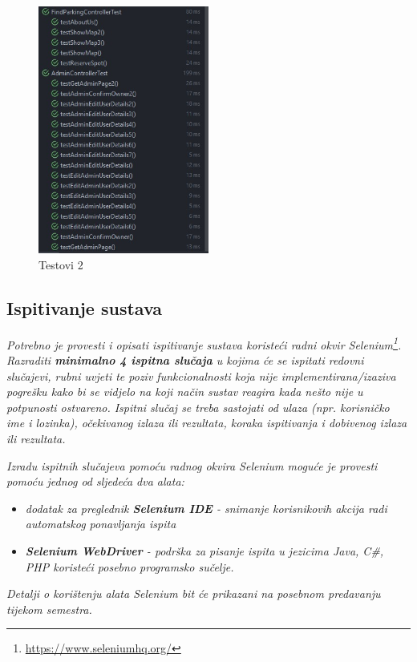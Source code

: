 		\begin{figure}[H]
			
			\includegraphics[width=0.5\textwidth]{slike/testovi2.jpeg} %
			\centering
			\caption{Testovi 2}
			\label{fig:testovi2}
		\end{figure}
			
			
			\subsection{Ispitivanje sustava}
			
			 \textit{Potrebno je provesti i opisati ispitivanje sustava koristeći radni okvir Selenium\footnote{\url{https://www.seleniumhq.org/}}. Razraditi \textbf{minimalno 4 ispitna slučaja} u kojima će se ispitati redovni slučajevi, rubni uvjeti te poziv funkcionalnosti koja nije implementirana/izaziva pogrešku kako bi se vidjelo na koji način sustav reagira kada nešto nije u potpunosti ostvareno. Ispitni slučaj se treba sastojati od ulaza (npr. korisničko ime i lozinka), očekivanog izlaza ili rezultata, koraka ispitivanja i dobivenog izlaza ili rezultata.\\ }
			 
			 \textit{Izradu ispitnih slučajeva pomoću radnog okvira Selenium moguće je provesti pomoću jednog od sljedeća dva alata:}
			 \begin{itemize}
			 	\item \textit{dodatak za preglednik \textbf{Selenium IDE} - snimanje korisnikovih akcija radi automatskog ponavljanja ispita	}
			 	\item \textit{\textbf{Selenium WebDriver} - podrška za pisanje ispita u jezicima Java, C\#, PHP koristeći posebno programsko sučelje.}
			 \end{itemize}
		 	\textit{Detalji o korištenju alata Selenium bit će prikazani na posebnom predavanju tijekom semestra.}
			
